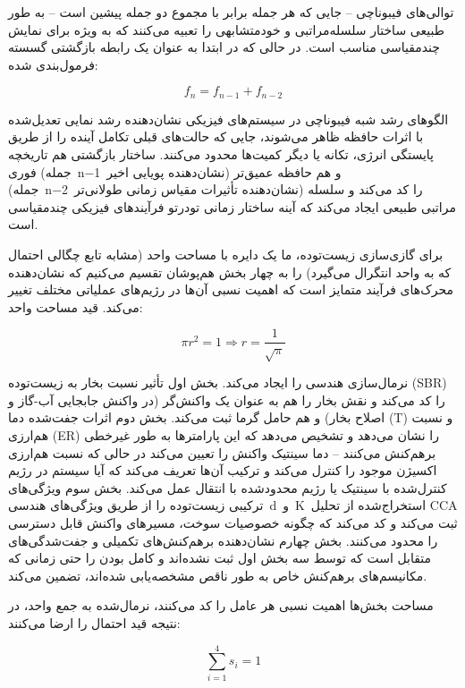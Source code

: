 \documentclass[12pt, a4paper]{article}
\begin{document}
توالی‌های فیبوناچی – جایی که هر جمله برابر با مجموع دو جمله پیشین است – به طور طبیعی ساختار سلسله‌مراتبی و خودمتشابهی را تعبیه می‌کنند که به ویژه برای نمایش چندمقیاسی مناسب است. در حالی که در ابتدا به عنوان یک رابطه بازگشتی گسسته فرمول‌بندی شده:

\begin{equation}
f_{n}=f_{n-1}+f_{n-2}
\end{equation}

الگوهای رشد شبه فیبوناچی در سیستم‌های فیزیکی نشان‌دهنده رشد نمایی تعدیل‌شده با اثرات حافظه ظاهر می‌شوند، جایی که حالت‌های قبلی تکامل آینده را از طریق پایستگی انرژی، تکانه یا دیگر کمیت‌ها محدود می‌کنند. ساختار بازگشتی هم تاریخچه فوری (جمله n−1 نشان‌دهنده پویایی اخیر) و هم حافظه عمیق‌تر (جمله n−2 نشان‌دهنده تأثیرات مقیاس زمانی طولانی‌تر) را کد می‌کند و سلسله مراتبی طبیعی ایجاد می‌کند که آینه ساختار زمانی تودرتو فرآیندهای فیزیکی چندمقیاسی است.

برای گازی‌سازی زیست‌توده، ما یک دایره با مساحت واحد (مشابه تابع چگالی احتمال که به واحد انتگرال می‌گیرد) را به چهار بخش هم‌پوشان تقسیم می‌کنیم که نشان‌دهنده محرک‌های فرآیند متمایز است که اهمیت نسبی آن‌ها در رژیم‌های عملیاتی مختلف تغییر می‌کند. قید مساحت واحد:

\begin{equation}
\pi r^{2}=1\Rightarrow r=\frac{1}{\sqrt{\pi}}
\end{equation}

نرمال‌سازی هندسی را ایجاد می‌کند. بخش اول تأثیر نسبت بخار به زیست‌توده (SBR) را کد می‌کند و نقش بخار را هم به عنوان یک واکنش‌گر (در واکنش جابجایی آب-گاز و اصلاح بخار) و هم حامل گرما ثبت می‌کند. بخش دوم اثرات جفت‌شده دما (T) و نسبت هم‌ارزی (ER) را نشان می‌دهد و تشخیص می‌دهد که این پارامترها به طور غیرخطی برهم‌کنش می‌کنند – دما سینتیک واکنش را تعیین می‌کند در حالی که نسبت هم‌ارزی اکسیژن موجود را کنترل می‌کند و ترکیب آن‌ها تعریف می‌کند که آیا سیستم در رژیم کنترل‌شده با سینتیک یا رژیم محدودشده با انتقال عمل می‌کند. بخش سوم ویژگی‌های ترکیبی زیست‌توده را از طریق ویژگی‌های هندسی d و K استخراج‌شده از تحلیل CCA ثبت می‌کند و کد می‌کند که چگونه خصوصیات سوخت، مسیرهای واکنش قابل دسترسی را محدود می‌کنند. بخش چهارم نشان‌دهنده برهم‌کنش‌های تکمیلی و جفت‌شدگی‌های متقابل است که توسط سه بخش اول ثبت نشده‌اند و کامل بودن را حتی زمانی که مکانیسم‌های برهم‌کنش خاص به طور ناقص مشخصه‌یابی شده‌اند، تضمین می‌کند.

مساحت بخش‌ها اهمیت نسبی هر عامل را کد می‌کنند، نرمال‌شده به جمع واحد، در نتیجه قید احتمال را ارضا می‌کنند:

\begin{equation}
\sum_{i=1}^{4} s_{i}=1
\end{equation}
\end{document}
